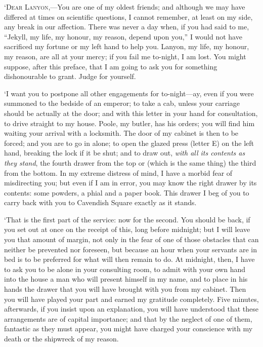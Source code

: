 \documentclass[]{novel}
\begin{document}
\begin{parascale}[0.9]
\textsc{‘Dear Lanyon,—}You are one of my oldest friends; and although we may have differed at times on scientific questions, I cannot remember, at least on my side, any break in our affection. There was never a day when, if you had said to me, “Jekyll, my life, my honour, my reason, depend upon you,” I would not have sacrificed my fortune or my left hand to help you. Lanyon, my life, my honour, my reason, are all at your mercy; if you fail me to-night, I am lost. You might suppose, after this preface, that I am going to ask you for something dishonourable to grant. Judge for yourself.

‘I want you to postpone all other engagements for to-night—ay, even if you were summoned to the bedside of an emperor; to take a cab, unless your carriage should be actually at the door; and with this letter in your hand for consultation, to drive straight to my house. Poole, my butler, has his orders; you will find him waiting your arrival with a locksmith. The door of my cabinet is then to be forced; and you are to go in alone; to open the glazed press (letter E) on the left hand, breaking the lock if it be shut; and to draw out, \emph{with all its contents as they stand}, the fourth drawer from the top or (which is the same thing) the third from the bottom. In my extreme distress of mind, I have a morbid fear of misdirecting you; but even if I am in error, you may know the right drawer by its contents: some powders, a phial and a paper book. This drawer I beg of you to carry back with you to Cavendish Square exactly as it stands.

‘That is the first part of the service: now for the second. You should be back, if you set out at once on the receipt of this, long before midnight; but I will leave you that amount of margin, not only in the fear of one of those obstacles that can neither be prevented nor foreseen, but because an hour when your servants are in bed is to be preferred for what will then remain to do. At midnight, then, I have to ask you to be alone in your consulting room, to admit with your own hand into the house a man who will present himself in my name, and to place in his hands the drawer that you will have brought with you from my cabinet. Then you will have played your part and earned my gratitude completely. Five minutes, afterwards, if you insist upon an explanation, you will have understood that these arrangements are of capital importance; and that by the neglect of one of them, fantastic as they must appear, you might have charged your conscience with my death or the shipwreck of my reason.


\end{parascale}
\end{document}
